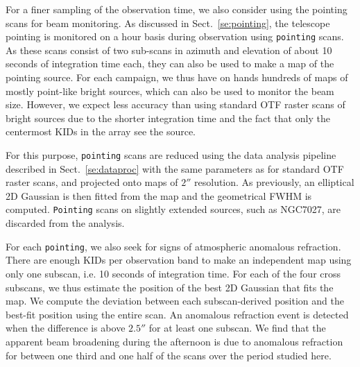 For a finer sampling of the observation time, we also consider using
the pointing scans for beam monitoring. As discussed in
Sect.~\ref{se:pointing}, the telescope pointing is
monitored on a hour basis during observation using {\tt pointing}
scans. As these scans consist of two sub-scans in azimuth and
elevation of about 10 seconds of integration time each, they
can also be used to make a map of the pointing source. For each campaign,
we thus have on hands hundreds of maps of mostly point-like bright
sources, which can also be used to monitor the beam size. However, we
expect less accuracy than using standard OTF raster
scans of bright sources due to the shorter integration time and the
fact that only the centermost KIDs in the array see the source.  

For this purpose, {\tt pointing} scans are reduced using
the data analysis pipeline described in
Sect.~\ref{se:dataproc} with the same parameters as for
standard OTF raster scans, and projected onto maps of $2''$ resolution.
As previously, an elliptical 2D Gaussian is then fitted from the map
and the geometrical FWHM%
is computed.
{\tt Pointing} scans on {\lp slightly extended} sources, such as NGC7027,
are discarded from the analysis.


For each {\tt pointing}, we also seek for signs of atmospheric anomalous refraction. There are
enough KIDs per observation band to make an independent map using only
one subscan, i.e. 10 seconds of integration time.
For each of the four cross subscans, we thus estimate the position of the best
2D Gaussian that fits the map. We compute the deviation between each
subscan-derived position and the best-fit position using the entire
scan. An anomalous refraction event is detected when the difference is
above $2.5''$ for at least one subscan. We find that the apparent beam
broadening during the afternoon is due to anomalous refraction for
between one third and one half of the scans over the period studied
here.

